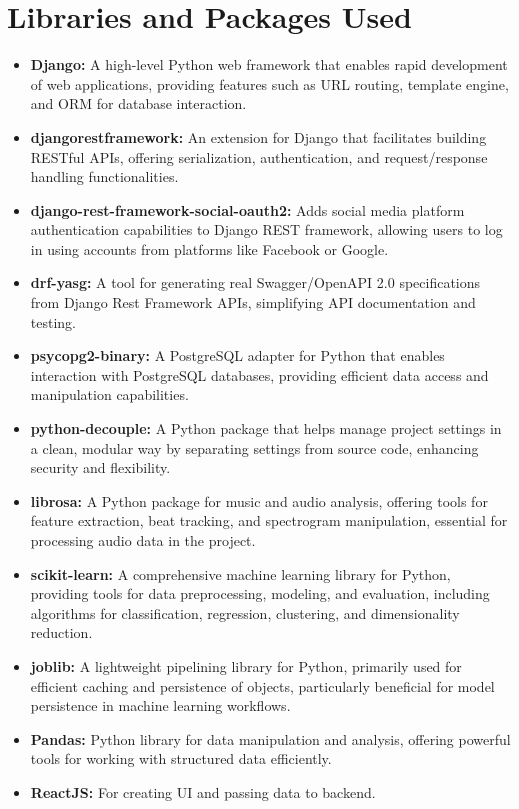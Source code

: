 \documentclass[11pt]{report}
\begin{document}
\clearpage


\section{Libraries and Packages Used}
\begin{itemize}
\item \textbf{Django:} A high-level Python web framework that enables rapid development of web applications, providing features such as URL routing, template engine, and ORM for database interaction.

\item \textbf{djangorestframework:} An extension for Django that facilitates building RESTful APIs, offering serialization, authentication, and request/response handling functionalities.

\item \textbf{django-rest-framework-social-oauth2:} Adds social media platform authentication capabilities to Django REST framework, allowing users to log in using accounts from platforms like Facebook or Google.

\item \textbf{drf-yasg:} A tool for generating real Swagger/OpenAPI 2.0 specifications from Django Rest Framework APIs, simplifying API documentation and testing.

\item \textbf{psycopg2-binary:} A PostgreSQL adapter for Python that enables interaction with PostgreSQL databases, providing efficient data access and manipulation capabilities.

\item \textbf{python-decouple:} A Python package that helps manage project settings in a clean, modular way by separating settings from source code, enhancing security and flexibility.

\item \textbf{librosa:} A Python package for music and audio analysis, offering tools for feature extraction, beat tracking, and spectrogram manipulation, essential for processing audio data in the project.

\item \textbf{scikit-learn:} A comprehensive machine learning library for Python, providing tools for data preprocessing, modeling, and evaluation, including algorithms for classification, regression, clustering, and dimensionality reduction.

\item \textbf{joblib:} A lightweight pipelining library for Python, primarily used for efficient caching and persistence of objects, particularly beneficial for model persistence in machine learning workflows.

\item \textbf{Pandas:} Python library for data manipulation and analysis, offering powerful tools for working with structured data efficiently.
\item \textbf{ReactJS:} For creating UI and passing data to backend.
\end{itemize}
\end{document}
